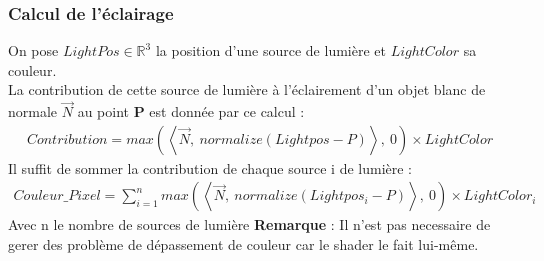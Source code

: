 \subsubsection{Calcul de l'éclairage}
On pose $LightPos \in \mathbb{R}^3$ la position d'une source de lumière et $LightColor$ sa couleur.
\\La contribution de cette source de lumière à l'éclairement d'un objet blanc de normale $\Vec{N}$ au point $\mathbf{P}$ est donnée par ce calcul : 
\begin{align*}
    Contribution=max(\left\langle \Vec{N},\ normalize(Lightpos-P) \right\rangle,\ 0) \times LightColor
\end{align*}
Il suffit de sommer la contribution de chaque source i de lumière :
\begin{align*}
    Couleur\_Pixel=\sum_{i=1}^{n} max(\left\langle \Vec{N},\ normalize(Lightpos_i-P) \right\rangle,\ 0) \times LightColor_i
\end{align*}
Avec n le nombre de sources de lumière
\textbf{Remarque} : Il n'est pas necessaire de gerer des problème de dépassement de couleur car le shader le fait lui-même.